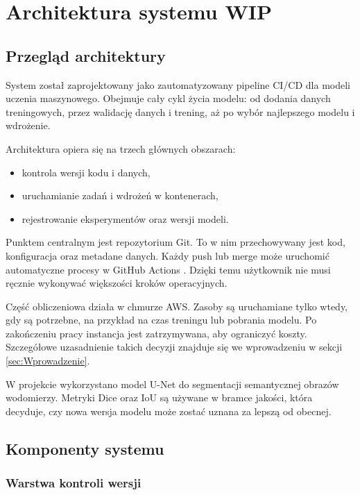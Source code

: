 \section{Architektura systemu WIP}
\label{sec:Architektura_systemu}

\subsection{Przegląd architektury}

System został zaprojektowany jako zautomatyzowany pipeline CI/CD dla modeli uczenia maszynowego. Obejmuje cały cykl życia modelu: od dodania danych treningowych, przez walidację danych i trening, aż po wybór najlepszego modelu i wdrożenie.

Architektura opiera się na trzech głównych obszarach:
\begin{itemize}
  \item kontrola wersji kodu i danych,
  \item uruchamianie zadań i wdrożeń w kontenerach,
  \item rejestrowanie eksperymentów oraz wersji modeli.
\end{itemize}

Punktem centralnym jest repozytorium Git. To w nim przechowywany jest kod, konfiguracja oraz metadane danych. Każdy push lub merge może uruchomić automatyczne procesy w GitHub Actions \cite{github_actions_docs}. Dzięki temu użytkownik nie musi ręcznie wykonywać większości kroków operacyjnych.

Część obliczeniowa działa w chmurze AWS. Zasoby są uruchamiane tylko wtedy, gdy są potrzebne, na przykład na czas treningu lub pobrania modelu. Po zakończeniu pracy instancja jest zatrzymywana, aby ograniczyć koszty. Szczegółowe uzasadnienie takich decyzji znajduje się we wprowadzeniu w sekcji \ref{sec:Wprowadzenie}.

W projekcie wykorzystano model U-Net do segmentacji semantycznej obrazów wodomierzy. Metryki Dice oraz IoU są używane w bramce jakości, która decyduje, czy nowa wersja modelu może zostać uznana za lepszą od obecnej.

\subsection{Komponenty systemu}

\subsubsection{Warstwa kontroli wersji}

